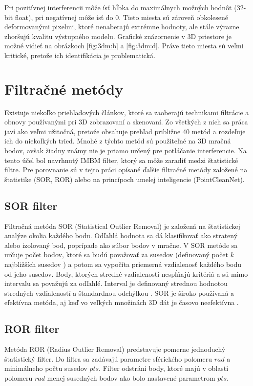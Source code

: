 Pri pozitívnej interferencii môže ísť hĺbka do maximálnych možných hodnôt (32-bit float), pri negatívnej môže ísť do 0. Tieto miesta sú zároveň obkolesené deformovanými pixelmi, ktoré nenaberajú extrémne hodnoty, ale stále výrazne zhoršujú kvalitu výstupného modelu. Grafické znázornenie v 3D priestore je možné vidieť na obrázkoch \ref{fig:3dm:b} a \ref{fig:3dm:d}. Práve tieto miesta sú veľmi kritické, pretože ich identifikácia je problematická. 

\section{Filtračné metódy}
\label{sec:filtmethods}

Existuje niekoľko priehľadových článkov, ktoré sa zaoberajú technikami filtrácie a obnovy používanými pri 3D zobrazovaní a skenovaní. Zo všetkých z nich sa práca \cite{Han} javí ako veľmi užitočná, pretože obsahuje prehľad približne 40 metód a rozdeľuje ich do niekoľkých tried. Mnohé z týchto metód sú použiteľné na 3D mračná bodov, avšak žiadny známy nie je priamo určený pre potláčanie interferencie. Na tento účel bol navrhnutý IMBM filter, ktorý sa môže zaradiť medzi štatistické filtre. Pre porovnanie sú v tejto práci opísané ďalšie filtračné metódy založené na štatistike (SOR, ROR) alebo na princípoch umelej inteligencie (PointCleanNet).   

\subsection{SOR filter}

Filtračná metóda SOR (Statistical Outlier Removal) je založená na štatistickej analýze okolia každého bodu. Odľahlá hodnota sa dá klasifikovať ako stratený alebo izolovaný bod, poprípade ako súbor bodov v mračne. V SOR metóde sa určuje počet bodov, ktoré sa budú považovať za susedov (definovaný počet $k$ najbližších susedov \cite{Pirotti}) a potom sa vypočíta priemerná vzdialenosť každého bodu od jeho susedov. Body, ktorých stredné vzdialenosti nespĺňajú kritériá a sú mimo intervalu sa považujú za odľahlé. Interval je definovaný strednou hodnotou stredných vzdialeností a štandardnou odchýlkou \cite{Corso}. SOR je široko používaná a efektívna metóda, aj keď vo veľkých množinách 3D dát je časovo neefektívna  \cite{Balta}.

\subsection{ROR filter}
Metóda ROR (Radius Outlier Removal) predstavuje pomerne jednoduchý štatistický filter. Do filtra sa zadávajú parametre sférického polomeru $rad$ a minimálneho počtu susedov $pts$. Filter odstráni body, ktoré majú v oblasti polomeru $rad$ menej susedných bodov ako bolo nastavené parametrom $pts$.


